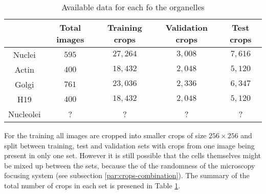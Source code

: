 \begin{table}[H]
    \centering
    \caption{Available data for each fo the organelles}
        \begin{adjustbox}{width=0.7\textwidth}
            \begin{tabular}{|c||c|c|c|c|}\hline
                &Total images
                &Training crops
                &Validation crops
                &Test crops
                \\\hline\hline
                Nuclei & $595$ & $27,264$ & $3,008$ & $7,616$\\\hline
                Actin &$400$ & $18,432$ & $2,048$ &$5,120$\\\hline
                Golgi & $761$ & $23,036$ & $2,336$ & $6,347$\\\hline
                H19 & $400$ & $18,432$ & $2,048$ & $5,120$ \\\hline
                Nucleolei &?&?&?&?\\\hline
            \end{tabular}
        \end{adjustbox}
    \label{table:data}
\end{table}

For the training all images are cropped into smaller crops of size $256 \times 256$ and split between training, test and validation sets with crops from one image being present in only one set. However it is still possible that the cells themselves might be mixed up between the sets, because the of the randomness of the microscopy focusing system (see subsection \ref{par:crops-combination}). The summary of the total number of crops in each set is presened in Table \ref{table:data}.

